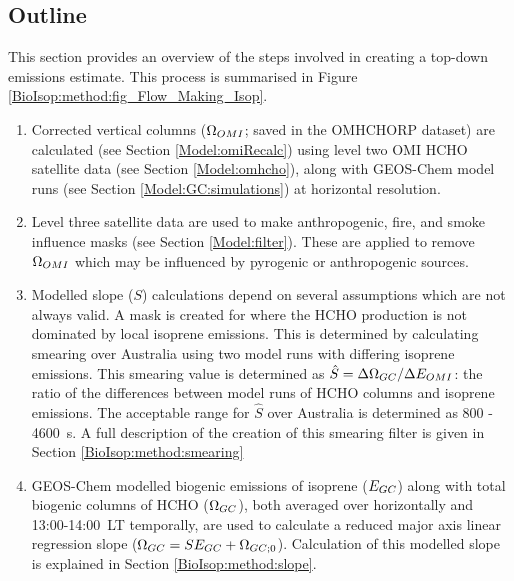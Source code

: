   
  
  \subsection{Outline}
    \label{BioIsop:method:outline}
    This section provides an overview of the steps involved in creating a top-down emissions estimate. %
    This process is summarised in Figure \ref{BioIsop:method:fig_Flow_Making_Isop}.
    \begin{enumerate}
      \item 
        Corrected vertical columns ($\Omega_{OMI}$; saved in the OMHCHORP dataset) are calculated (see Section \ref{Model:omiRecalc}) using level two OMI HCHO satellite data (see Section \ref{Model:omhcho}), along with GEOS-Chem model runs (see Section \ref{Model:GC:simulations}) at \highhr horizontal resolution.
      \item 
        Level three satellite data are used to make anthropogenic, fire, and smoke influence masks (see Section \ref{Model:filter}).
        These are applied to remove $\Omega_{OMI}$ which may be influenced by pyrogenic or anthropogenic sources. 
      \item
        Modelled slope ($S$) calculations depend on several assumptions which are not always valid.
        A mask is created for where the HCHO production is not dominated by local isoprene emissions. 
        This is determined by calculating smearing over Australia using two model runs with differing isoprene emissions.
        This smearing value is determined as $\hat{S}=\Delta \Omega_{GC}/ \Delta E_{OMI}$: the ratio of the differences between model runs of HCHO columns and isoprene emissions.
        The acceptable range for $\hat{S}$ over Australia is determined as 800 - 4600~s.
        A full description of the creation of this smearing filter is given in Section \ref{BioIsop:method:smearing}
      \item 
        GEOS-Chem modelled biogenic emissions of isoprene ($E_{GC}$) along with total biogenic columns of HCHO ($\Omega_{GC}$), both averaged over \lowhr horizontally and 13:00-14:00~LT temporally, are used to calculate a reduced major axis linear regression slope ($\Omega_{GC}=S E_{GC} + \Omega_{GC;0}$).
        Calculation of this modelled slope is explained in Section \ref{BioIsop:method:slope}.

\end{enumerate}
